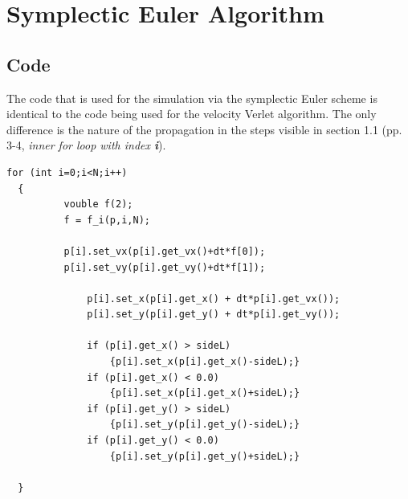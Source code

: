 \documentclass[12pt,a4paper]{article}	%
\newcommand{\x}{\textbf}
\begin{document}
\newpage

\section{Symplectic Euler Algorithm}

\subsection{Code}

The code that is used for the simulation via the symplectic Euler scheme is identical to the code being used for the velocity Verlet algorithm. The only difference is the nature of the propagation in the steps visible in section 1.1 (pp. 3-4, \textit{inner for loop with index \x{i}}).
\begin{lstlisting}[frame=single]  
for (int i=0;i<N;i++)
  {
	      vouble f(2);
	      f = f_i(p,i,N);
		              
	      p[i].set_vx(p[i].get_vx()+dt*f[0]);
	      p[i].set_vy(p[i].get_vy()+dt*f[1]);

              p[i].set_x(p[i].get_x() + dt*p[i].get_vx());
              p[i].set_y(p[i].get_y() + dt*p[i].get_vy());

    	      if (p[i].get_x() > sideL) 
    	          {p[i].set_x(p[i].get_x()-sideL);}
 	          if (p[i].get_x() < 0.0) 
 	              {p[i].set_x(p[i].get_x()+sideL);}
    	      if (p[i].get_y() > sideL) 
    	          {p[i].set_y(p[i].get_y()-sideL);}
 	          if (p[i].get_y() < 0.0) 
 	              {p[i].set_y(p[i].get_y()+sideL);}

  }
\end{lstlisting}
%
%
%

\end{document}
